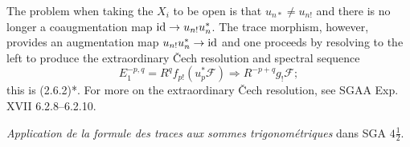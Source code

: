\documentclass[deligne.tex]{subfiles}
\begin{document}
The problem when taking the $X_i$ to be open is that $u_{n*}\ne u_{n!}$ and
there is no longer a coaugmentation map $\operatorname{id}\rightarrow u_{n!}u_n^*$.
The trace morphism, however, provides an augmentation map
$u_{n!}u_n^*\rightarrow\operatorname{id}$ and one proceeds by resolving to the left to produce the
extraordinary \v Cech resolution and spectral sequence
\begin{equation*}
	E_1^{-p,q}=R^qf_{p!}(u_p^*\mathscr F)\Rightarrow R^{-p+q}g_!\mathscr F;
\end{equation*}
this is (2.6.2)*.
For more on the extraordinary \v Cech resolution, see
SGAA Exp. XVII 6.2.8--6.2.10.

\begin{thebibliography}{Sommes trig.}
	 \textit{Application de la formule des traces aux sommes trigonométriques}
	dans SGA $4\frac12$.
\end{thebibliography}
\end{document}
